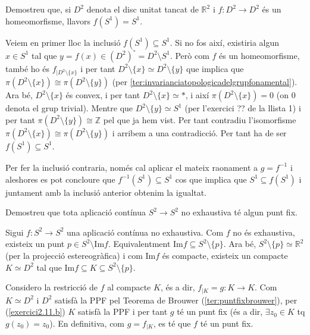 \documentclass[../main.tex]{subfiles}
\begin{document}
\begin{exercici}
[Exercici 7]\label{exercici2.7} Demostreu que, si $D^2$ denota el disc unitat tancat de $\mathbb{R}^2$ i $f:D^2\rightarrow D^2$ és un homeomorfisme, llavors $f(S^1)=S^1$.
\end{exercici}
\begin{sol}
Veiem en primer lloc la inclusió $f(S^1)\subseteq S^1$. Si no fos així, existiria algun $x\in S^1$ tal que $y=f(x)\in (D^2)^\circ = D^2\setminus S^1$. Però com $f$ és un homeomorfisme, també ho és $f_{|D^2\setminus\{x\}}$ i per tant $D^2\setminus\{x\}\simeq D^2\setminus\{y\}$ que implica que $\pi(D^2\setminus\{x\})\cong \pi(D^2\setminus\{y\})$ (per \ref{ter:invarianciatopologicadelgrupfonamental}). Ara bé, $D^2\setminus\{x\}$ és convex, i per tant $D^2\setminus\{x\}\simeq *$, i així $\pi(D^2\setminus\{x\}) = 0$ (on 0 denota el grup trivial). Mentre que $D^2\setminus\{y\}\simeq S^1$ (per l'exercici ?? de la llista 1) i per tant $\pi(D^2\setminus\{y\})\cong \mathbb{Z}$ pel que ja hem vist. Per tant contradiu l'isomorfisme $\pi(D^2\setminus\{x\})\cong \pi(D^2\setminus\{y\})$ i arribem a una contradicció. Per tant ha de ser $f(S^1)\subseteq S^1$.

Per fer la inclusió contraria, només cal aplicar el mateix raonament a $g = f^{-1}$ i aleshores es pot concloure que $f^{-1}(S^1)\subseteq S^1$ cos que implica que $S^1\subseteq f(S^1)$ i juntament amb la inclusió anterior obtenim la igualtat.
\end{sol}



\begin{exercici}
[Exercici 8]\label{exercici2.8} Demostreu que tota aplicació contínua $S^2\rightarrow S^2$ no exhaustiva té algun punt fix.
\end{exercici}
\begin{sol}
Sigui $f:S^2\rightarrow S^2$ una aplicació contínua no exhaustiva. Com $f$ no és exhaustiva, existeix un punt $p\in S^2\setminus \mathrm{Im}f$. Equivalentment $\mathrm{Im}f\subseteq S^2\setminus\{p\}$. Ara bé, $S^2\setminus\{p\}\simeq \mathbb{R}^2$ (per la projecció estereogràfica) i com $\mathrm{Im}f$ és compacte, existeix un compacte $K\simeq D^2$ tal que $\mathrm{Im}f\subseteq K\subseteq S^2\setminus\{p\}$.

Considero la restricció de $f$ al compacte $K$, és a dir, $f_{|K}=g:K\rightarrow K$. Com $K\simeq D^2$ i $D^2$ satisfà la PPF pel Teorema de Brouwer (\ref{ter:puntfixbrouwer}), per (\ref{exercici2.11.b}) $K$ satisfà la PPF i per tant $g$ té un punt fix (és a dir, $\exists z_0\in K$ tq $g(z_0) = z_0$). En definitiva, com $g=f_{|K}$, es té que $f$ té un punt fix.
\end{sol}
\end{document}
